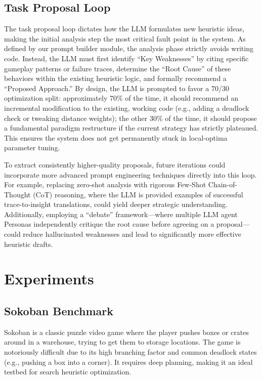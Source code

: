 \documentclass{article}
\begin{document}
\subsection{Task Proposal Loop}
\label{sec:method_task_proposal}

The task proposal loop dictates how the LLM formulates new heuristic ideas, making the initial analysis step the most critical fault point in the system. As defined by our prompt builder module, the analysis phase strictly avoids writing code. Instead, the LLM must first identify ``Key Weaknesses'' by citing specific gameplay patterns or failure traces, determine the ``Root Cause'' of these behaviors within the existing heuristic logic, and formally recommend a ``Proposed Approach.'' By design, the LLM is prompted to favor a 70/30 optimization split: approximately 70\% of the time, it should recommend an incremental modification to the existing, working code (e.g., adding a deadlock check or tweaking distance weights); the other 30\% of the time, it should propose a fundamental paradigm restructure if the current strategy has strictly plateaued. This ensures the system does not get permanently stuck in local-optima parameter tuning.

To extract consistently higher-quality proposals, future iterations could incorporate more advanced prompt engineering techniques directly into this loop. For example, replacing zero-shot analysis with rigorous Few-Shot Chain-of-Thought (CoT) reasoning, where the LLM is provided examples of successful trace-to-insight translations, could yield deeper strategic understanding. Additionally, employing a ``debate'' framework---where multiple LLM agent Personas independently critique the root cause before agreeing on a proposal---could reduce hallucinated weaknesses and lead to significantly more effective heuristic drafts.

\section{Experiments}
\label{sec:experiments}

\subsection{Sokoban Benchmark}
\label{sec:exp_sokoban}

Sokoban is a classic puzzle video game where the player pushes boxes or crates around in a warehouse, trying to get them to storage locations. The game is notoriously difficult due to its high branching factor and common deadlock states (e.g., pushing a box into a corner). It requires deep planning, making it an ideal testbed for search heuristic optimization.
\end{document}
